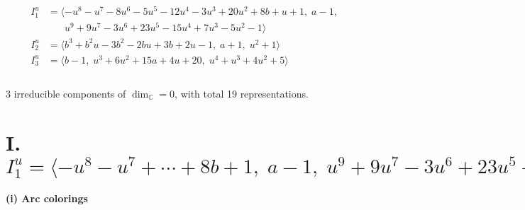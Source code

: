 \documentclass[1p]{elsarticle_modified}
\theoremstyle{definition}
\begin{document}
\begin{align*}
I^u_{1}&=\langle 
- u^8- u^7-8 u^6-5 u^5-12 u^4-3 u^3+20 u^2+8 b+u+1,\;a-1,\\
\phantom{I^u_{1}}&\phantom{= \langle  }u^9+9 u^7-3 u^6+23 u^5-15 u^4+7 u^3-5 u^2-1\rangle \\
I^u_{2}&=\langle 
b^3+b^2 u-3 b^2-2 b u+3 b+2 u-1,\;a+1,\;u^2+1\rangle \\
I^u_{3}&=\langle 
b-1,\;u^3+6 u^2+15 a+4 u+20,\;u^4+u^3+4 u^2+5\rangle \\
\\
\end{align*}
\raggedright * 3 irreducible components of $\dim_{\mathbb{C}}=0$, with total 19 representations.\\
\newpage
\renewcommand{\arraystretch}{1}
\centering \section*{I. $I^u_{1}= \langle - u^8- u^7+\cdots+8 b+1,\;a-1,\;u^9+9 u^7-3 u^6+23 u^5-15 u^4+7 u^3-5 u^2-1 \rangle$}
\flushleft \textbf{(i) Arc colorings}\\
\end{document}
